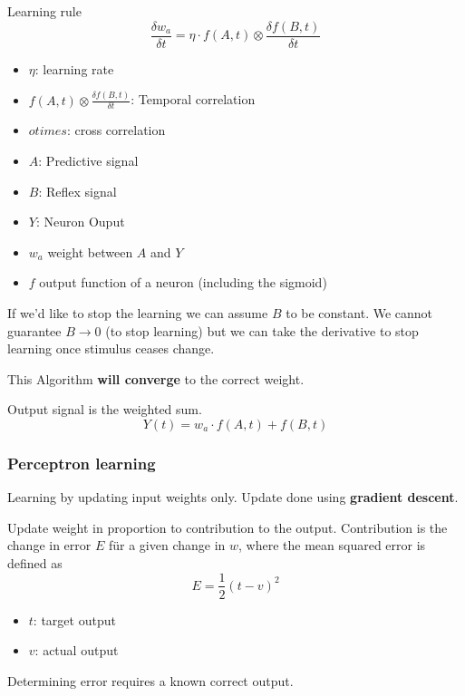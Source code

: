 \documentclass[
    fontsize      = 11pt,
    paper         = a4,
    twoside       = false,
    parskip       = half,
    pagesize      = false,
]{scrartcl}
\providecommand{\tightlist}{%
  \setlength{\itemsep}{0pt}\setlength{\parskip}{0pt}}
\begin{document}
Learning rule
\[\frac{\delta w_a}{\delta t} = \eta \cdot f \left( A, t\right) \otimes \frac{\delta f \left( B, t\right) }{\delta t}\]

\begin{itemize}
\tightlist
\item
  \(\eta\): learning rate
\item
  \(f\left( A, t\right) \otimes \frac{\delta f \left( B, t\right) }{\delta t}\):
  Temporal correlation
\item
  \(otimes\): cross correlation
\item
  \(A\): Predictive signal
\item
  \(B\): Reflex signal
\item
  \(Y\): Neuron Ouput
\item
  \(w_a\) weight between \(A\) and \(Y\)
\item
  \(f\) output function of a neuron (including the sigmoid)
\end{itemize}

If we'd like to stop the learning we can assume \(B\) to be constant. We
cannot guarantee \(B \rightarrow 0\) (to stop learning) but we can take
the derivative to stop learning once stimulus ceases change.

This Algorithm \textbf{will converge} to the correct weight.

Output signal is the weighted sum.
\[Y(t) = w_a \cdot f \left( A, t\right) + f \left( B, t\right)\]

\hypertarget{perceptron-learning}{%
\subsubsection{Perceptron learning}\label{perceptron-learning}}

Learning by updating input weights only. Update done using
\textbf{gradient descent}.

Update weight in proportion to contribution to the output. Contribution
is the change in error \(E\) für a given change in \(w\), where the mean
squared error is defined as \[E = \frac{1}{2} \left( t-v\right)^2\]

\begin{itemize}
\tightlist
\item
  \(t\): target output
\item
  \(v\): actual output
\end{itemize}

Determining error requires a known correct output.
\end{document}
